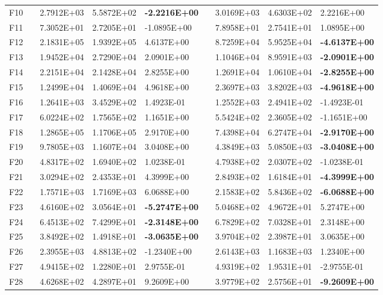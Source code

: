 \documentclass[graybox]{svmult}
\begin{document}
\begin{table}[]
\begin{tabular}{@{}cllllllll@{}}
    F10 &  & 2.7912E+03 & 5.5872E+02 & \textbf{-2.2216E+00} &  & 3.0169E+03 & 4.6303E+02 & 2.2216E+00 \\
    F11 &  & 7.3052E+01 & 2.7205E+01 & -1.0895E+00 &  & 7.8958E+01 & 2.7541E+01 & 1.0895E+00 \\
    F12 &  & 2.1831E+05 & 1.9392E+05 & 4.6137E+00 &  & 8.7259E+04 & 5.9525E+04 & \textbf{-4.6137E+00} \\
    F13 &  & 1.9452E+04 & 2.7290E+04 & 2.0901E+00 &  & 1.1046E+04 & 8.9591E+03 & \textbf{-2.0901E+00} \\
    F14 &  & 2.2151E+04 & 2.1428E+04 & 2.8255E+00 &  & 1.2691E+04 & 1.0610E+04 & \textbf{-2.8255E+00} \\
    F15 &  & 1.2499E+04 & 1.4069E+04 & 4.9618E+00 &  & 2.3697E+03 & 3.8202E+03 & \textbf{-4.9618E+00} \\
    F16 &  & 1.2641E+03 & 3.4529E+02 & 1.4923E-01 &  & 1.2552E+03 & 2.4941E+02 & -1.4923E-01 \\
    F17 &  & 6.0224E+02 & 1.7565E+02 & 1.1651E+00 &  & 5.5424E+02 & 2.3605E+02 & -1.1651E+00 \\
    F18 &  & 1.2865E+05 & 1.1706E+05 & 2.9170E+00 &  & 7.4398E+04 & 6.2747E+04 & \textbf{-2.9170E+00} \\
    F19 &  & 9.7805E+03 & 1.1607E+04 & 3.0408E+00 &  & 4.3849E+03 & 5.0850E+03 & \textbf{-3.0408E+00} \\
    F20 &  & 4.8317E+02 & 1.6940E+02 & 1.0238E-01 &  & 4.7938E+02 & 2.0307E+02 & -1.0238E-01 \\
    F21 &  & 3.0294E+02 & 2.4353E+01 & 4.3999E+00 &  & 2.8493E+02 & 1.6184E+01 & \textbf{-4.3999E+00} \\
    F22 &  & 1.7571E+03 & 1.7169E+03 & 6.0688E+00 &  & 2.1583E+02 & 5.8436E+02 & \textbf{-6.0688E+00} \\
    F23 &  & 4.6160E+02 & 3.0564E+01 & \textbf{-5.2747E+00} &  & 5.0468E+02 & 4.9672E+01 & 5.2747E+00 \\
    F24 &  & 6.4513E+02 & 7.4299E+01 & \textbf{-2.3148E+00} &  & 6.7829E+02 & 7.0328E+01 & 2.3148E+00 \\
    F25 &  & 3.8492E+02 & 1.4918E+01 & \textbf{-3.0635E+00} &  & 3.9704E+02 & 2.3987E+01 & 3.0635E+00 \\
    F26 &  & 2.3955E+03 & 4.8813E+02 & -1.2340E+00 &  & 2.6143E+03 & 1.1683E+03 & 1.2340E+00 \\
    F27 &  & 4.9415E+02 & 1.2280E+01 & 2.9755E-01 &  & 4.9319E+02 & 1.9531E+01 & -2.9755E-01 \\
    F28 &  & 4.6268E+02 & 4.2897E+01 & 9.2609E+00 &  & 3.9779E+02 & 2.5756E+01 & \textbf{-9.2609E+00} \\

\end{tabular}
\end{table}
\end{document}
